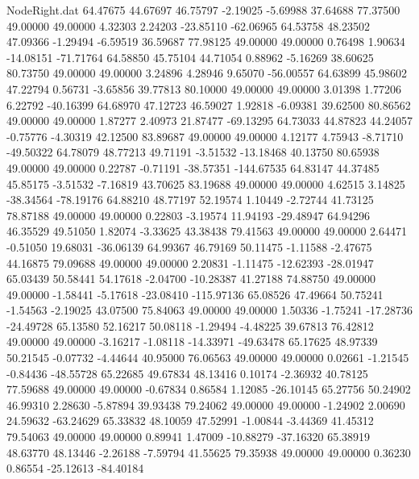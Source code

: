 \begin{filecontents}{NodeRight.dat}
  64.47675   44.67697   46.75797    -2.19025   -5.69988   37.64688   77.37500   49.00000   49.00000    4.32303    2.24203  -23.85110  -62.06965
  64.53758   48.23502   47.09366    -1.29494   -6.59519   36.59687   77.98125   49.00000   49.00000    0.76498    1.90634  -14.08151  -71.71764
  64.58850   45.75104   44.71054     0.88962   -5.16269   38.60625   80.73750   49.00000   49.00000    3.24896    4.28946    9.65070  -56.00557
  64.63899   45.98602   47.22794     0.56731   -3.65856   39.77813   80.10000   49.00000   49.00000    3.01398    1.77206    6.22792  -40.16399
  64.68970   47.12723   46.59027     1.92818   -6.09381   39.62500   80.86562   49.00000   49.00000    1.87277    2.40973   21.87477  -69.13295
  64.73033   44.87823   44.24057    -0.75776   -4.30319   42.12500   83.89687   49.00000   49.00000    4.12177    4.75943   -8.71710  -49.50322
  64.78079   48.77213   49.71191    -3.51532  -13.18468   40.13750   80.65938   49.00000   49.00000    0.22787   -0.71191  -38.57351 -144.67535
  64.83147   44.37485   45.85175    -3.51532   -7.16819   43.70625   83.19688   49.00000   49.00000    4.62515    3.14825  -38.34564  -78.19176
  64.88210   48.77197   52.19574     1.10449   -2.72744   41.73125   78.87188   49.00000   49.00000    0.22803   -3.19574   11.94193  -29.48947
  64.94296   46.35529   49.51050     1.82074   -3.33625   43.38438   79.41563   49.00000   49.00000    2.64471   -0.51050   19.68031  -36.06139
  64.99367   46.79169   50.11475    -1.11588   -2.47675   44.16875   79.09688   49.00000   49.00000    2.20831   -1.11475  -12.62393  -28.01947
  65.03439   50.58441   54.17618    -2.04700  -10.28387   41.27188   74.88750   49.00000   49.00000   -1.58441   -5.17618  -23.08410 -115.97136
  65.08526   47.49664   50.75241    -1.54563   -2.19025   43.07500   75.84063   49.00000   49.00000    1.50336   -1.75241  -17.28736  -24.49728
  65.13580   52.16217   50.08118    -1.29494   -4.48225   39.67813   76.42812   49.00000   49.00000   -3.16217   -1.08118  -14.33971  -49.63478
  65.17625   48.97339   50.21545    -0.07732   -4.44644   40.95000   76.06563   49.00000   49.00000    0.02661   -1.21545   -0.84436  -48.55728
  65.22685   49.67834   48.13416     0.10174   -2.36932   40.78125   77.59688   49.00000   49.00000   -0.67834    0.86584    1.12085  -26.10145
  65.27756   50.24902   46.99310     2.28630   -5.87894   39.93438   79.24062   49.00000   49.00000   -1.24902    2.00690   24.59632  -63.24629
  65.33832   48.10059   47.52991    -1.00844   -3.44369   41.45312   79.54063   49.00000   49.00000    0.89941    1.47009  -10.88279  -37.16320
  65.38919   48.63770   48.13446    -2.26188   -7.59794   41.55625   79.35938   49.00000   49.00000    0.36230    0.86554  -25.12613  -84.40184

\end{filecontents}
